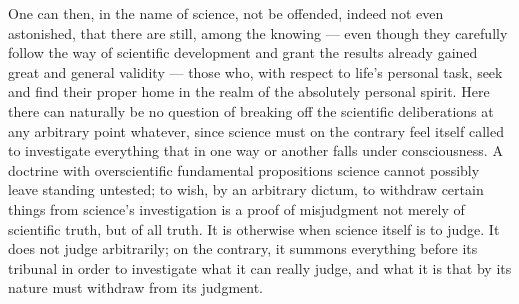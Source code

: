 \documentclass[12pt]{book}
\begin{document}
One can then, in the name of science, not be offended, indeed not even astonished, that there are
still, among the knowing --- even though they carefully follow the way of scientific development and
grant the results already gained great and general validity --- those who, with respect to life's
personal task, seek and find their proper home in the realm of the absolutely personal spirit. Here
there can naturally be no question of breaking off the scientific deliberations at any arbitrary
point whatever, since science must on the contrary feel itself called to investigate everything that
in one way or another falls under consciousness. A doctrine with overscientific fundamental
propositions science cannot possibly leave standing untested; to wish, by an arbitrary dictum, to
withdraw certain things from science's investigation is a proof of misjudgment not merely of
scientific truth, but of all truth. It is otherwise when science itself is to judge. It does not
judge arbitrarily; on the contrary, it summons everything before its tribunal in order to
investigate what it can really judge, and what it is that by its nature must withdraw from its
judgment.
\end{document}
